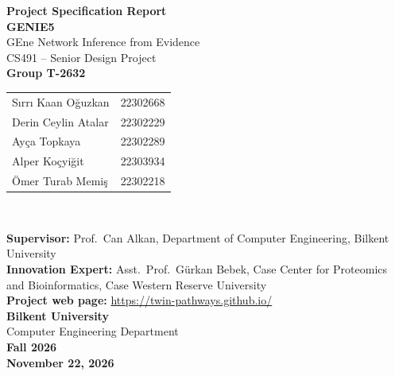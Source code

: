 \documentclass[11pt,a4paper]{article}
\begin{document}
\begin{titlepage}
    \centering
    \vspace*{1cm}
    \Huge
    \textbf{Project Specification Report}\\
    \vspace{0.5cm}
    \textbf{GENIE5}\\
    \vspace{0.5cm}
    \LARGE
    GEne Network Inference from Evidence\\
    \vspace{1.5cm}
    CS491 -- Senior Design Project\\
    \vspace{0.5cm}
    \textbf{Group T-2632}\\
    \vspace{1.0cm}

    \large
    \begin{tabular}{ll}
    S\i rr\i{} Kaan O\u{g}uzkan & 22302668\\
    Derin Ceylin Atalar & 22302229\\
    Ay\c{c}a Topkaya & 22302289\\
    Alper Ko\c{c}yi\u{g}it & 22303934\\
    \"Omer Turab Memi\c{s} & 22302218\\
    \end{tabular}\\
    \vspace{1cm}

    \textbf{Supervisor:} Prof.\ Can Alkan, Department of Computer Engineering, Bilkent University\\[0.3em]
    \textbf{Innovation Expert:} Asst.\ Prof.\ G\"urkan Bebek, Case Center for Proteomics and
    Bioinformatics, Case Western Reserve University\\[0.3em]
    \textbf{Project web page:} \url{https://twin-pathways.github.io/}\\
    \vfill
    \Large
    \textbf{Bilkent University}\\
    Computer Engineering Department\\
    \vspace{1.5cm}
    \textbf{Fall 2026}\\
    \vspace{1.5cm}
    \textbf{November 22, 2026}
\end{titlepage}

\tableofcontents
\newpage

\end{document}
